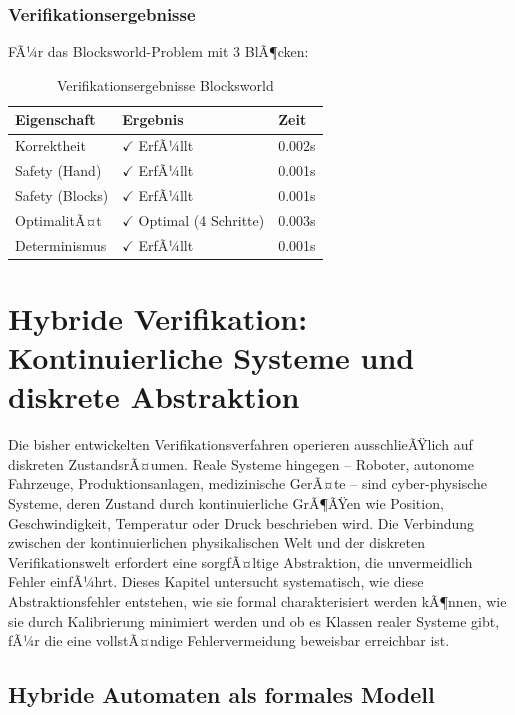 ﻿\documentclass[a4paper,12pt]{article}
\theoremstyle{definition}
\begin{document}
\subsubsection{Verifikationsergebnisse}

FÃ¼r das Blocksworld-Problem mit 3 BlÃ¶cken:

\begin{table}[h]
	\centering
	\caption{Verifikationsergebnisse Blocksworld}
	\label{tab:blocksworld_verification}
	\begin{tabular}{lll}
		\toprule
		Eigenschaft & Ergebnis & Zeit \\
		\midrule
		Korrektheit & $\checkmark$ ErfÃ¼llt & 0.002s \\
		Safety (Hand) & $\checkmark$ ErfÃ¼llt & 0.001s \\
		Safety (Blocks) & $\checkmark$ ErfÃ¼llt & 0.001s \\
		OptimalitÃ¤t & $\checkmark$ Optimal (4 Schritte) & 0.003s \\
		Determinismus & $\checkmark$ ErfÃ¼llt & 0.001s \\
		\bottomrule
	\end{tabular}
\end{table}

\section{Hybride Verifikation: Kontinuierliche Systeme und diskrete Abstraktion}

Die bisher entwickelten Verifikationsverfahren operieren ausschlieÃŸlich auf diskreten ZustandsrÃ¤umen. Reale Systeme hingegen -- Roboter, autonome Fahrzeuge, Produktionsanlagen, medizinische GerÃ¤te -- sind cyber-physische Systeme, deren Zustand durch kontinuierliche GrÃ¶ÃŸen wie Position, Geschwindigkeit, Temperatur oder Druck beschrieben wird. Die Verbindung zwischen der kontinuierlichen physikalischen Welt und der diskreten Verifikationswelt erfordert eine sorgfÃ¤ltige Abstraktion, die unvermeidlich Fehler einfÃ¼hrt. Dieses Kapitel untersucht systematisch, wie diese Abstraktionsfehler entstehen, wie sie formal charakterisiert werden kÃ¶nnen, wie sie durch Kalibrierung minimiert werden und ob es Klassen realer Systeme gibt, fÃ¼r die eine vollstÃ¤ndige Fehlervermeidung beweisbar erreichbar ist.

\subsection{Hybride Automaten als formales Modell}
\end{document}
